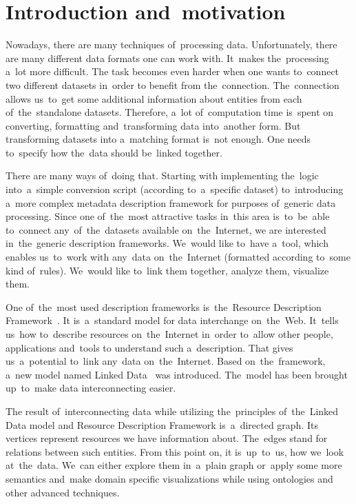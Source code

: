 \chapter*{Introduction and~motivation}
\label{ch:preface}
Nowadays, there are many techniques of~processing data. Unfortunately, there are many
different data formats one can work with. It~makes the~processing a~lot more difficult.
The task becomes even harder when one wants to~connect two different datasets in~order to
benefit from the~connection. The~connection allows us~to~get some additional information
about entities from each of~the~standalone datasets. Therefore, a~lot of~computation time is~spent
on converting, formatting and~transforming data into~another form. But transforming datasets
into a~matching format is~not enough. One needs to~specify how the~data should be~linked
together.

There are many ways of~doing that. Starting with implementing the~logic into~a~simple conversion
script (according to~a~specific dataset) to~introducing a~more complex metadata description
framework for purposes of~generic data processing. Since one of~the~most attractive
tasks in~this area is~to~be~able to~connect any~of~the~datasets available on~the~Internet,
we are interested in~the~generic description frameworks. We~would like to~have 
a~tool, 
which enables us~to~work with any~data on~the~Internet (formatted according to~some
kind of~rules). We~would like to~link them together, analyze them, visualize 
them.

One of~the~most used description frameworks is~the~Resource Description Framework~\cite{rdf}.
It is~a~standard model for data interchange on~the~Web. It~tells us~how to~describe
resources on~the~Internet in~order to~allow other people, applications and~tools
to understand such a~description. That gives us~a~potential to~link any~data on~the~Internet.
Based on~the~framework, a~new model named Linked Data~\cite{ld} was introduced. The~model
has been brought up~to~make data interconnecting easier.

The result of~interconnecting data while utilizing the~principles of~the~Linked Data model
and Resource Description Framework is~a~directed graph. Its vertices represent resources we
have information about. The~edges stand for relations between such entities. From this point on,
it is~up~to~us, how we~look at~the~data. We~can either explore them in~a~plain graph or~apply
some more semantics and~make domain specific visualizations while using ontologies
and other advanced techniques.

